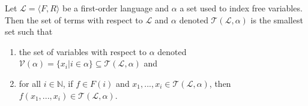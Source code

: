 \begin{definition}[Term]\label{def:term}
    \leanok
    Let $\mathcal{L} = \langle F, R \rangle$ be a first-order language and $\alpha$ a set used to index free variables. Then the set of terms with respect to $\mathcal{L}$ and $\alpha$ denoted $\mathcal{T}(\mathcal{L},\alpha)$ is the smallest set such that
        \begin{enumerate}
            \item the set of variables with respect to $\alpha$ denoted $\mathcal{V}(\alpha) = \{x_i | i \in \alpha\} \subseteq \mathcal{T}(\mathcal{L},\alpha)$ and
            \item for all $i \in \mathbb{N}$, if $f \in F(i)$ and $x_1,...,x_i \in \mathcal{T}(\mathcal{L},\alpha)$, then $f(x_1,...,x_i) \in \mathcal{T}(\mathcal{L},\alpha)$.
        \end{enumerate}
\end{definition}




